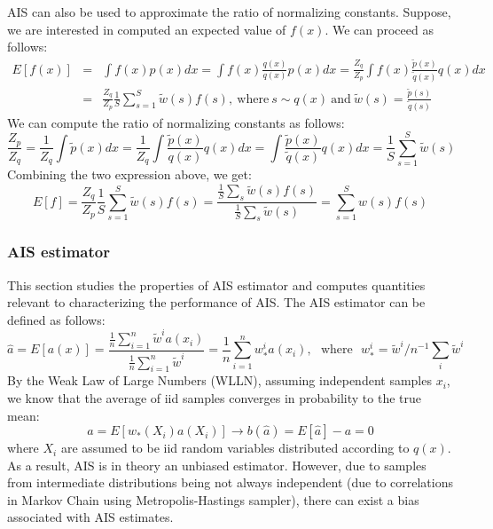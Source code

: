 AIS can also be used to approximate the ratio of normalizing constants. Suppose, we are interested in computed an expected value of $f(x)$. We can proceed as follows:
\begin{eqnarray}
    E[f(x)] &=& \int f(x)p(x)dx = \int f(x)\frac{q(x)}{q(x)}p(x)dx = \frac{Z_q}{Z_p}\int f(x)\frac{\tilde{p}(x)}{\tilde{q}(x)}q(x)dx \nonumber \\
    &=& \frac{Z_q}{Z_p}\frac{1}{S}\sum_{s=1}^{S}\tilde{w}(s)f(s),~\mathrm{where}~s\sim q(x)~\mathrm{and}~\tilde{w}(s) = \frac{\tilde{p}(s)}{\tilde{q}(s)}
\end{eqnarray}
We can compute the ratio of normalizing constants as follows:
\begin{equation}
    \frac{Z_p}{Z_q} = \frac{1}{Z_q}\int \tilde{p}(x)dx = \frac{1}{Z_q}\int \frac{\tilde{p}(x)}{q(x)}q(x)dx = \int \frac{\tilde{p}(x)}{\tilde{q}(x)}q(x)dx = \frac{1}{S}\sum_{s=1}^{S}\tilde{w}(s)
\end{equation}
Combining the two expression above, we get:
\begin{equation}
    E[f] = \frac{Z_q}{Z_p}\frac{1}{S}\sum_{s=1}^{S}\tilde{w}(s)f(s) = \frac{\frac{1}{S}\sum_s \tilde{w}(s)f(s)}{\frac{1}{S}\sum_s \tilde{w}(s)} = \sum_{s=1}^{S}w(s)f(s)
\end{equation}

\subsubsection{AIS estimator}

This section studies the properties of AIS estimator and computes quantities relevant to characterizing the performance of AIS. The AIS estimator can be defined as follows:
\begin{equation}
    \hat{a} = E[a(x)] = \frac{\frac{1}{n}\sum_{i=1}^{n} \tilde{w}^{i}a(x_i)}{\frac{1}{n}\sum_{i=1}^{n}\tilde{w}^{i}} = \frac{1}{n}\sum_{i=1}^{n} w_{\ast}^{i}a(x_i),~~~\mathrm{where}~~~w_{\ast}^{i} = \tilde{w}^{i} / n^{-1}\sum_i \tilde{w}^{i}
\end{equation}
By the Weak Law of Large Numbers (WLLN), assuming independent samples $x_i$, we know that the average of iid samples converges in probability to the true mean:
\begin{equation}
   a = E[w_{\ast}(X_i)a(X_i)] \rightarrow b(\hat{a}) = E[\hat{a}] - a = 0
\end{equation}
where $X_i$ are assumed to be iid random variables distributed according to $q(x)$. As a result, AIS is in theory an unbiased estimator. However, due to samples from intermediate distributions being not always independent (due to correlations in Markov Chain using Metropolis-Hastings sampler), there can exist a bias associated with AIS estimates.\\

